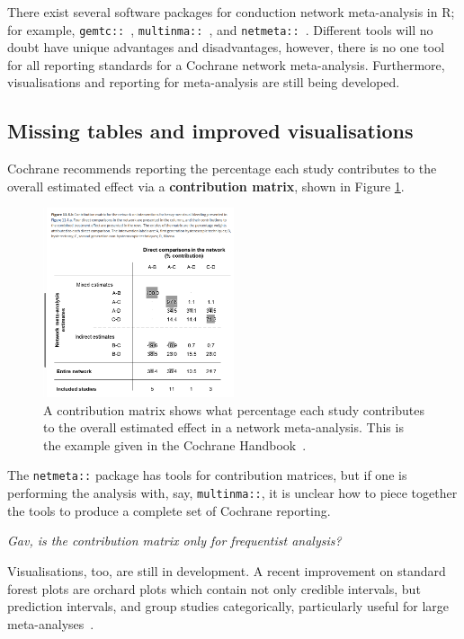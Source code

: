 \documentclass[12pt]{article}\usepackage[]{graphicx}\usepackage[]{color}
\newcommand{\package}[1]{\texttt{{#1::}}}
\begin{document}
There exist several software packages for conduction network meta-analysis in R; for example, \package{gemtc}~\cite{valkenhoef_gemtc_2020}, \package{multinma}~\cite{phillippo_multinma_2020}, and \package{netmeta}~\cite{rucker_netmeta_2021}. Different tools will no doubt have unique advantages and disadvantages, however, there is no one tool for all reporting standards for a Cochrane network meta-analysis. Furthermore, visualisations and reporting for meta-analysis are still being developed.

\subsection{Missing tables and improved visualisations}


Cochrane recommends reporting the percentage each study contributes to the overall estimated effect via a \textbf{contribution matrix}, shown in Figure \ref{fig:cmatrix}.

\begin{figure}
\centering
\includegraphics[width=0.5\textwidth]{contribution-matrix}
\caption{A contribution matrix shows what percentage each study contributes to the overall estimated effect in a network meta-analysis. This is the example given in the Cochrane Handbook~\cite{higgins2019cochrane}.}
\label{fig:cmatrix}
\end{figure}

The \package{netmeta} package has tools for contribution matrices, but if one is performing the analysis with, say, \package{multinma}, it is unclear how to piece together the tools to produce a complete set of Cochrane reporting.

\emph{Gav, is the contribution matrix only for frequentist analysis?}

Visualisations, too, are still in development. A recent improvement on standard forest plots are orchard plots which contain not only credible intervals, but prediction intervals, and group studies categorically, particularly useful for large meta-analyses~\cite{nakagawa_orchard_2021}.
\end{document}
